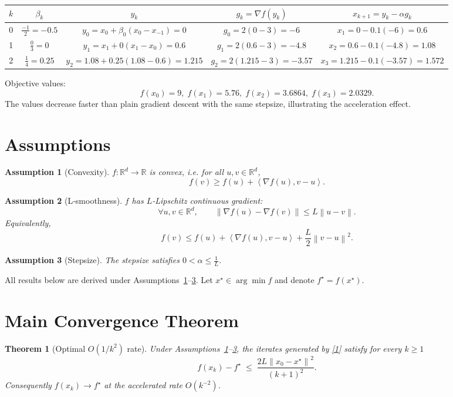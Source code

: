 \documentclass{article}
\newtheorem{theorem}{Theorem}
\newtheorem{assumption}{Assumption}
\newcommand{\norm}[1]{\left\|#1\right\|}
\newcommand{\ip}[2]{\left\langle #1,#2\right\rangle}
\newcommand{\grad}{\nabla}
\begin{document}
\begin{center}
\begin{tabular}{c|c|c|c|c}
$k$ & $\beta_k$ & $y_k$ & $g_k=\grad f(y_k)$ & $x_{k+1}=y_k-\alpha g_k$ \\ \hline
0 & $\frac{-1}{2}= -0.5$ & $y_0 = x_0+\beta_0(x_0-x_{-1})=0$ & $g_0=2(0-3)=-6$ & $x_1=0-0.1(-6)=0.6$ \\[4pt]
1 & $\frac{0}{3}=0$ & $y_1 = x_1+0(x_1-x_0)=0.6$ & $g_1=2(0.6-3)=-4.8$ & $x_2=0.6-0.1(-4.8)=1.08$ \\[4pt]
2 & $\frac{1}{4}=0.25$ & $y_2 = 1.08+0.25(1.08-0.6)=1.215$ & $g_2=2(1.215-3)=-3.57$ & $x_3=1.215-0.1(-3.57)=1.572$ 
\end{tabular}
\end{center}

Objective values:
\[
f(x_0)=9,\; f(x_1)=5.76,\; f(x_2)=3.6864,\; f(x_3)=2.0329.
\]
The values decrease faster than plain gradient descent with the same stepsize, illustrating the acceleration effect.

\newpage
\section*{Assumptions}
\begin{assumption}[Convexity]\label{ass:convex}
$f:\mathbb{R}^d\to\mathbb{R}$ is convex, i.e. for all $u,v\in\mathbb{R}^d$,
\[
f(v)\ge f(u)+\ip{\grad f(u)}{v-u}.
\]
\end{assumption}
\begin{assumption}[L‑smoothness]\label{ass:smooth}
$f$ has $L$‑Lipschitz continuous gradient:
\[
\forall u,v\in\mathbb{R}^d,\qquad 
\norm{\grad f(u)-\grad f(v)}\le L\norm{u-v}.
\]
Equivalently,
\[
f(v)\le f(u)+\ip{\grad f(u)}{v-u}+\frac{L}{2}\norm{v-u}^2.
\tag{2}
\]
\end{assumption}
\begin{assumption}[Stepsize]\label{ass:step}
The stepsize satisfies $0<\alpha\le \tfrac{1}{L}$.
\end{assumption}
All results below are derived under Assumptions~\ref{ass:convex}–\ref{ass:step}.  
Let $x^{\star}\in\arg\min f$ and denote $f^{\star}=f(x^{\star})$.

\section*{Main Convergence Theorem}
\begin{theorem}[Optimal $O(1/k^{2})$ rate]\label{thm:rate}
Under Assumptions~\ref{ass:convex}–\ref{ass:step}, the iterates generated by \eqref{1} satisfy for every $k\ge 1$  
\[
f(x_k)-f^{\star}\;\le\; \frac{2L\norm{x_0-x^{\star}}^{2}}{(k+1)^{2}} .
\tag{3}
\]
Consequently $f(x_k)\to f^{\star}$ at the accelerated rate $O(k^{-2})$.
\end{theorem}
\end{document}
